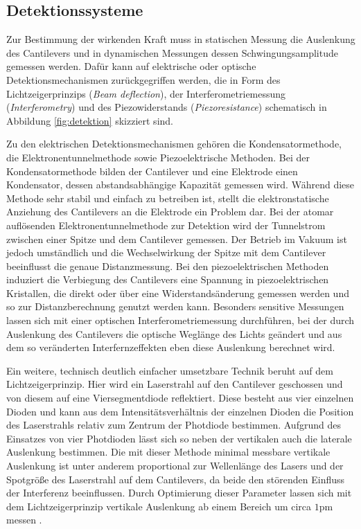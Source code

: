           \FloatBarrier




      \newpage
      \subsection{Detektionssysteme}
          Zur Bestimmung der wirkenden Kraft muss in statischen Messung die Auslenkung des Cantilevers und in dynamischen Messungen dessen Schwingungsamplitude gemessen werden. Dafür kann auf elektrische
          oder optische Detektionsmechanismen zurückgegriffen werden, die in Form des Lichtzeigerprinzips (\textit{Beam deflection}), der Interferometriemessung (\textit{Interferometry}) und des Piezowiderstands (\textit{Piezoresistance}) schematisch in Abbildung \ref{fig:detektion} skizziert sind. 

          Zu den elektrischen Detektionsmechanismen gehören die Kondensatormethode, die Elektronentunnelmethode sowie Piezoelektrische Methoden. Bei der Kondensatormethode bilden der Cantilever und eine
          Elektrode einen Kondensator, dessen abstandsabhängige Kapazität gemessen wird. Während diese Methode sehr stabil und einfach zu betreiben ist, stellt die elektronstatische Anziehung des Cantilevers
          an die Elektrode ein Problem dar. Bei der atomar auflösenden Elektronentunnelmethode zur Detektion wird der Tunnelstrom zwischen einer Spitze und dem Cantilever gemessen. 
          Der Betrieb im Vakuum ist jedoch umständlich und die Wechselwirkung der Spitze mit dem Cantilever beeinflusst die genaue Distanzmessung. Bei den piezoelektrischen Methoden induziert die Verbiegung
          des Cantilevers eine Spannung in piezoelektrischen Kristallen, die direkt oder über eine Widerstandsänderung gemessen werden und so zur Distanzberechnung genutzt werden kann. 
          Besonders sensitive Messungen lassen sich mit einer optischen Interferometriemessung durchführen, bei der durch Auslenkung des Cantilevers die optische Weglänge des Lichts geändert und aus dem so
          veränderten Interfernzeffekten eben diese Auslenkung berechnet wird.

          Ein weitere, technisch deutlich einfacher umsetzbare Technik beruht auf dem Lichtzeigerprinzip. Hier wird ein Laserstrahl auf den Cantilever geschossen und von diesem auf eine Viersegmentdiode 
          reflektiert. Diese besteht aus vier einzelnen Dioden und kann aus dem Intensitätsverhältnis der einzelnen Dioden die Position des Laserstrahls relativ zum Zentrum der Photdiode bestimmen. Aufgrund
          des Einsatzes von vier Photdioden lässt sich so neben der vertikalen auch die laterale Auslenkung bestimmen. Die mit dieser Methode minimal messbare vertikale Auslenkung ist unter anderem proportional
          zur Wellenlänge des Lasers und der Spotgröße des Laserstrahl auf dem Cantilevers, da beide den störenden Einfluss der Interferenz beeinflussen. Durch Optimierung dieser Parameter lassen sich mit dem
          Lichtzeigerprinzip vertikale Auslenkung ab einem Bereich um circa $1 \si{\pico\metre}$ messen \cite{voigtlander_scanning_2015}.


